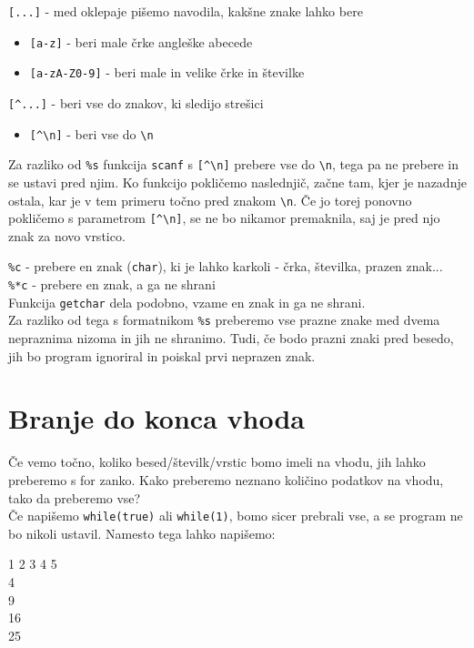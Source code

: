 \documentclass{book}
\begin{document}
\verb+[...]+ - med oklepaje pišemo navodila, kakšne znake lahko bere
\begin{itemize}
	\item \verb+[a-z]+ - beri male črke angleške abecede
	\item \verb+[a-zA-Z0-9]+ - beri male in velike črke in številke
\end{itemize}

\verb+[^...]+ - beri vse do znakov, ki sledijo strešici
\begin{itemize}
	\item \verb+[^\n]+ - beri vse do \verb+\n+
\end{itemize}

\begin{errors}
Za razliko od \verb+%s+ funkcija \verb+scanf+ s \verb+[^\n]+ prebere vse do \verb+\n+, tega pa ne prebere in se ustavi pred njim. Ko funkcijo pokličemo naslednjič, začne tam, kjer je nazadnje ostala, kar je v tem primeru točno pred znakom \verb+\n+. Če jo torej ponovno pokličemo s parametrom \verb+[^\n]+, se ne bo nikamor premaknila, saj je pred njo znak za novo vrstico. \\
\end{errors}

\verb+%c+ - prebere en znak (\verb+char+), ki je lahko karkoli - črka, številka, prazen znak... \\
\verb+%*c+ - prebere en znak, a ga ne shrani \\
Funkcija \verb+getchar+ dela podobno, vzame en znak in ga ne shrani. \\

Za razliko od tega s formatnikom \verb+%s+ preberemo vse prazne znake med dvema
nepraznima nizoma in jih ne shranimo. Tudi, če bodo prazni znaki pred besedo,
jih bo program ignoriral in poiskal prvi neprazen znak.

\newpage
\section{Branje do konca vhoda}

Če vemo točno, koliko besed/številk/vrstic bomo imeli na vhodu, jih lahko preberemo s for zanko. Kako preberemo neznano količino podatkov na vhodu, tako da preberemo vse? \\
Če napišemo \verb+while(true)+ ali \verb+while(1)+, bomo sicer prebrali vse, a se program ne bo nikoli ustavil.
Namesto tega lahko napišemo:

\begin{examples}


\begin{inout}
1 2 3 4 5
\\4\\9\\16\\25
\end{inout}
\end{examples}
\end{document}

